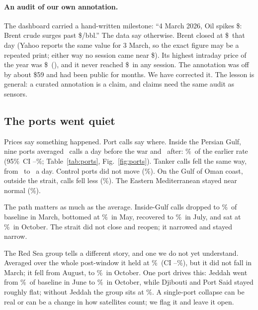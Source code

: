 \documentclass[10pt,twocolumn,letterpaper]{article}
\newcommand{\pct}{\%}
\begin{document}
\begin{table}[t]
\centering\small
\caption{Change in close from the last pre-war session (27 February 2026). Daily closes from Yahoo Finance \citep{yahoofinance}; the peak column is the date of Brent's highest close (31 March).}\label{tab:markets}

\end{table}

\paragraph{An audit of our own annotation.}
The dashboard carried a hand-written milestone: ``4 March 2026, Oil spikes \$\AuditClaim: Brent crude surges past \$\AuditClaim/bbl.'' The data say otherwise. Brent closed at \$\AuditClose\ that day (Yahoo reports the same value for 3 March, so the exact figure may be a repeated print; either way no session came near \$\AuditClaim). Its highest intraday price of the year was \$\AuditHigh\ (\AuditHighDate), and it never reached \$\AuditClaim\ in any session. The annotation was off by about \$59 and had been public for months. We have corrected it. The lesson is general: a curated annotation is a claim, and claims need the same audit as sensors.

\subsection{The ports went quiet}
Prices say something happened. Port calls say where. Inside the Persian Gulf, nine ports averaged \GulfPre\ calls a day before the war and \GulfPost\ after: \GulfRatio\pct\ of the earlier rate (95\pct\ CI \GulfLo--\GulfHi\pct; Table~\ref{tab:ports}, Fig.~\ref{fig:ports}). Tanker calls fell the same way, from \GulfTankPre\ to \GulfTankPost\ a day. Control ports did not move (\CtrlRatio\pct). On the Gulf of Oman coast, outside the strait, calls fell less (\OmanRatio\pct). The Eastern Mediterranean stayed near normal (\MedRatio\pct).

The path matters as much as the average. Inside-Gulf calls dropped to \GulfMar\pct\ of baseline in March, bottomed at \GulfMay\pct\ in May, recovered to \GulfJul\pct\ in July, and sat at \GulfOct\pct\ in October. The strait did not close and reopen; it narrowed and stayed narrow.

The Red Sea group tells a different story, and one we do not yet understand. Averaged over the whole post-window it held at \RedRatio\pct\ (CI \RedLo--\RedHi\pct), but it did not fall in March; it fell from August, to \RedOct\pct\ in October. One port drives this: Jeddah went from \JeddahJun\pct\ of baseline in June to \JeddahOct\pct\ in October, while Djibouti and Port Said stayed roughly flat; without Jeddah the group sits at \RedExJeddah\pct. A single-port collapse can be real or can be a change in how satellites count; we flag it and leave it open.
\end{document}
